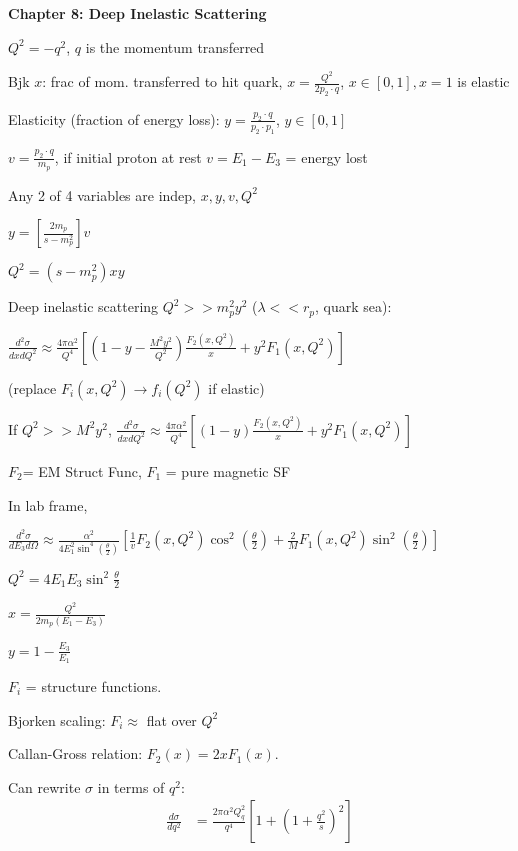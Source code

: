 \textbf{Chapter 8: Deep Inelastic Scattering}

$Q^2 = -q^2$, $q$ is the momentum transferred

Bjk $x$: frac of mom. transferred to hit quark, $x = \frac{Q^2}{2p_2 \cdot q}$, $x \in [0,1], x=1$ is elastic

Elasticity (fraction of energy loss): $y = \frac{p_2 \cdot q}{p_2 \cdot p_1}$, $y \in [0,1]$

$v = \frac{p_2 \cdot q}{m_p}$, if initial proton at rest $v=E_1-E_3$ = energy lost

Any 2 of 4 variables are indep, $x, y, v, Q^2$

$y = \left[\frac{2m_p}{s - m_p^2}\right]v$

$Q^2 = (s - m_p^2)xy$

Deep inelastic scattering $Q^2 >> m_p^2 y^2$ ($\lambda << r_p$, quark sea): 

$\frac{d^2\sigma}{dx dQ^2} \approx \frac{4\pi \alpha^2}{Q^4}\left[(1-y - \frac{M^2y^2}{Q^2})\frac{F_2(x,Q^2)}{x} + y^2 F_1(x,Q^2)\right]$

(replace $F_i(x,Q^2) \to f_i(Q^2)$ if elastic)

If $Q^2 >> M^2y^2$, $\frac{d^2\sigma}{dx dQ^2} \approx \frac{4\pi \alpha^2}{Q^4}\left[(1-y)\frac{F_2(x,Q^2)}{x} + y^2 F_1(x,Q^2)\right]$

$F_2$= EM Struct Func, $F_1$ = pure magnetic SF

In lab frame,

$\frac{d^2\sigma}{dE_3 d\Omega} \approx \frac{\alpha^2}{4E_1^2\sin^4(\frac{\theta}{2})}\left[\frac{1}{v}F_2(x,Q^2)\cos^2(\frac{\theta}{2}) + \frac{2}{M} F_1(x,Q^2)\sin^2(\frac{\theta}{2})\right]$




$Q^2 = 4E_1E_3\sin^2\frac{\theta}{2}$

$x = \frac{Q^2}{2m_p(E_1-E_3)}$

$y = 1 - \frac{E_3}{E_1}$

$F_i$ = structure functions.

Bjorken scaling: $F_i \approx$ flat over $Q^2$

Callan-Gross relation: $F_2(x)=2xF_1(x)$.

Can rewrite $\sigma$ in terms of $q^2$:
\begin{align*}
    \frac{d\sigma}{dq^2} &= \frac{2\pi\alpha^2 Q_q^2}{q^4}\left[1 + \left(1 + \frac{q^2}{s}\right)^2\right]
\end{align*}

